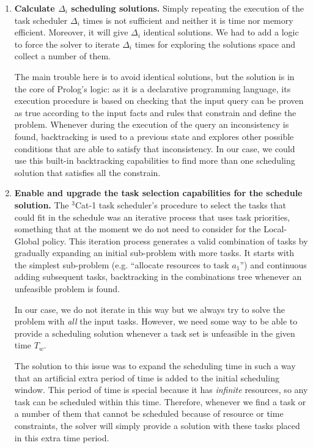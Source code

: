 \begin{enumerate}
\item \textbf{Calculate $\Delta_i$ scheduling solutions. } Simply repeating the execution of the task scheduler $\Delta_i$ times is not sufficient and neither it is time nor memory efficient. Moreover, it will give $\Delta_i$ identical solutions. We had to add a logic to force the solver to iterate $\Delta_i$ times for exploring the solutions space and collect a number of them.

The main trouble here is to avoid identical solutions, but the solution is in the core of Prolog's logic: as it is a declarative programming language, its execution procedure is based on checking that the input query can be proven as true according to the input facts and rules that constrain and define the problem. Whenever during the execution of the query an inconsistency is found, backtracking is used to a previous state and explores other possible conditions that are able to satisfy that inconsistency. In our case, we could use this built-in backtracking capabilities to find more than one scheduling solution that satisfies all the constrain.

\item \textbf{Enable and upgrade the task selection capabilities for the schedule solution. } The $^3$Cat-1 task scheduler's procedure to select the tasks that could fit in the schedule was an iterative process that uses task priorities, something that at the moment we do not need to consider for the Local-Global policy. This iteration process generates a valid combination of tasks by gradually expanding an initial sub-problem with more tasks. It starts with the simplest sub-problem (e.g. ``allocate resources to task $a_1$'') and continuous adding subsequent tasks, backtracking in the combinations tree whenever an unfeasible problem is found.

In our case, we do not iterate in this way but we always try to solve the problem with \emph{all} the input tasks. However, we need some way to be able to provide a scheduling solution whenever a task set is unfeasible in the given time $T_w$.

The solution to this issue was to expand the scheduling time in such a way that an artificial extra period of time is added to the initial scheduling window. This period of time is special because it has \emph{infinite} resources, so any task can be scheduled within this time. Therefore, whenever we find a task or a number of them that cannot be scheduled because of resource or time constraints, the solver will simply provide a solution with these tasks placed in this extra time period.


\end{enumerate}
